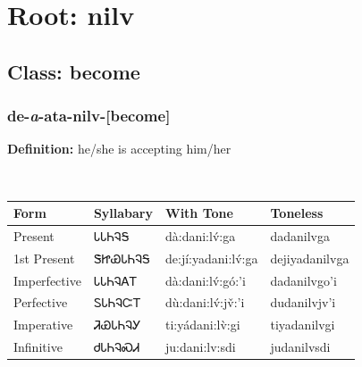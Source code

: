 \needspace{4in}
\section*{Root: nilv}
\nopagebreak
{}
\needspace{3in}
\subsection*{Class: become}
\nopagebreak
\needspace{2in}
\subsubsection*{de{-}\textit{a}{-}ata{-}\textbf{nilv}{-}[become]}
\nopagebreak
\textbf{Definition: } he/she is accepting him/her
\\[0.5em]
\begin{tabularx}{\textwidth}{l X X X}%
\toprule%
\textbf{Form}&\textbf{Syllabary}&\textbf{With Tone}&\textbf{Toneless}\\%
\midrule%
Present&ᏓᏓᏂᎸᎦ&dà:dani:lv́:ga&dadanilvga\\%
1st Present&ᏕᏥᏯᏓᏂᎸᎦ&de:jí:yadani:lv́:ga&dejiyadanilvga\\%
Imperfective&ᏓᏓᏂᎸᎪᎢ&dà:dani:lv́:gó:’i&dadanilvgo’i\\%
Perfective&ᏚᏓᏂᎸᏨᎢ&dù:dani:lv́:jv̌:’i&dudanilvjv’i\\%
Imperative&ᏘᏯᏓᏂᎸᎩ&ti:yádani:lv̀:gi&tiyadanilvgi\\%
Infinitive&ᏧᏓᏂᎸᏍᏗ&ju:dani:lv:sdi&judanilvsdi\\%
\bottomrule%
\end{tabularx}
\\[1em]